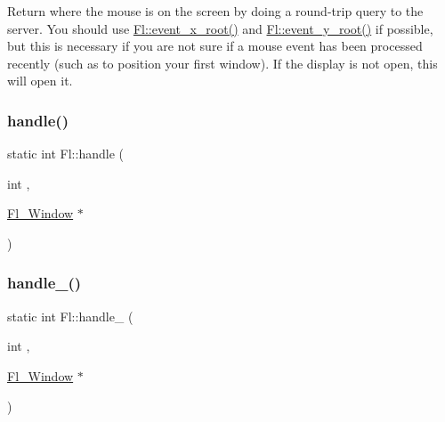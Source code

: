 Return where the mouse is on the screen by doing a round-\/trip query to the server. You should use \hyperlink{group__fl__events_ga4c40bd0d2960354c9778fdb65a2b720d}{Fl\+::event\+\_\+x\+\_\+root()} and \hyperlink{group__fl__events_ga9801003f911eae0e49bf52b875dcaaa5}{Fl\+::event\+\_\+y\+\_\+root()} if possible, but this is necessary if you are not sure if a mouse event has been processed recently (such as to position your first window). If the display is not open, this will open it. \mbox{\label{group__fl__events_ga62aea907b7eb34f14adbb8c92b2df221}} 
\subsubsection{\texorpdfstring{handle()}{handle()}}
{\footnotesize\ttfamily static int Fl\+::handle (\begin{DoxyParamCaption}\item[{int}]{,  }\item[{\hyperlink{class_fl___window}{Fl\+\_\+\+Window} $\ast$}]{ }\end{DoxyParamCaption})\hspace{0.3cm}{\ttfamily [static]}}

\mbox{\label{group__fl__events_ga0527dc884bbea7cb3ef1d7e1d0c50b71}} 
\subsubsection{\texorpdfstring{handle\+\_\+()}{handle\_()}}
{\footnotesize\ttfamily static int Fl\+::handle\+\_\+ (\begin{DoxyParamCaption}\item[{int}]{,  }\item[{\hyperlink{class_fl___window}{Fl\+\_\+\+Window} $\ast$}]{ }\end{DoxyParamCaption})\hspace{0.3cm}{\ttfamily [static]}}

\mbox{\label{group__fl__events_gadcd24382935bf08b56b1532dfe80da25}} 
